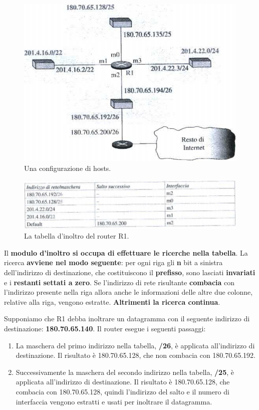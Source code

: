 \documentclass[11pt,a4paper,oneside]{book}
\theoremstyle{definition}
\begin{document}
\begin{figure}[!h]
	\includegraphics[scale=0.35]{Immagini/Ip_ex.png}
	\centering
	\caption{Una configurazione di hosts.}
\end{figure}
\begin{figure}[!h]
	\includegraphics[scale=0.4]{Immagini/Ip_ex1.png}
	\centering
	\caption{La tabella d'inoltro del router R1.}
\end{figure}

Il \textbf{modulo d'inoltro si occupa di effettuare le ricerche nella tabella}. La ricerca \textbf{avviene nel modo seguente}: per ogni riga gli \textbf{n} bit a sinistra dell'indirizzo di destinazione, che costituiscono il \textbf{prefisso}, sono lasciati \textbf{invariati} e i \textbf{restanti settati a zero}. Se l'indirizzo di rete risultante \textbf{combacia} con l'indirizzo presente nella riga allora anche le informazioni delle altre due colonne, relative alla riga, vengono estratte. \textbf{Altrimenti la ricerca continua}.

Supponiamo che R1 debba inoltrare un datagramma con il seguente indirizzo di destinazione: \textbf{180.70.65.140}.
Il router esegue i seguenti passaggi:
\begin{enumerate}
	\item La maschera del primo indirizzo nella tabella, \textbf{/26}, è applicata all'indirizzo di destinazione. Il risultato è 180.70.65.128, che non combacia con 180.70.65.192.
	\item Successivamente la maschera del secondo indirizzo nella tabella, \textbf{/25}, è applicata all'indirizzo di destinazione. Il risultato è 180.70.65.128, che combacia con 180.70.65.128, quindi l'indirizzo del salto e il numero di interfaccia vengono estratti e usati per inoltrare il datagramma.
\end{enumerate}
\end{document}
